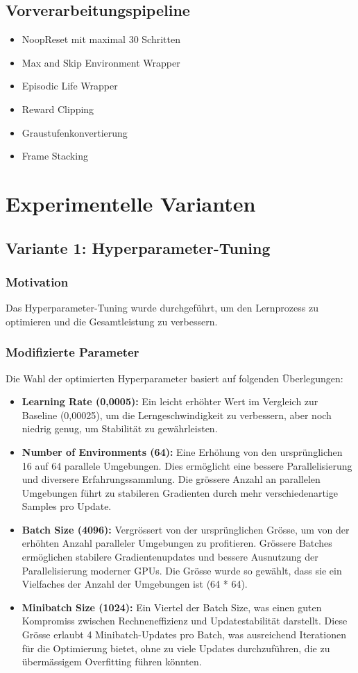\documentclass{article}
\begin{document}
\subsection{Vorverarbeitungspipeline}
\begin{itemize}
    \item NoopReset mit maximal 30 Schritten
    \item Max and Skip Environment Wrapper
    \item Episodic Life Wrapper
    \item Reward Clipping
    \item Graustufenkonvertierung
    \item Frame Stacking
\end{itemize}

\section{Experimentelle Varianten}

\subsection{Variante 1: Hyperparameter-Tuning}
\subsubsection{Motivation}
Das Hyperparameter-Tuning wurde durchgeführt, um den Lernprozess zu optimieren und die Gesamtleistung zu verbessern.

\subsubsection{Modifizierte Parameter}
Die Wahl der optimierten Hyperparameter basiert auf folgenden Überlegungen:
\begin{itemize}
\item \textbf{Learning Rate (0,0005):} Ein leicht erhöhter Wert im Vergleich zur Baseline (0,00025), um die Lerngeschwindigkeit zu verbessern, aber noch niedrig genug, um Stabilität zu gewährleisten.
\item \textbf{Number of Environments (64):} Eine Erhöhung von den ursprünglichen 16 auf 64 parallele Umgebungen. Dies ermöglicht eine bessere Parallelisierung und diversere Erfahrungssammlung. Die grössere Anzahl an parallelen Umgebungen führt zu stabileren Gradienten durch mehr verschiedenartige Samples pro Update.
\item \textbf{Batch Size (4096):} Vergrössert von der ursprünglichen Grösse, um von der erhöhten Anzahl paralleler Umgebungen zu profitieren. Grössere Batches ermöglichen stabilere Gradientenupdates und bessere Ausnutzung der Parallelisierung moderner GPUs. Die Grösse wurde so gewählt, dass sie ein Vielfaches der Anzahl der Umgebungen ist (64 * 64).
\item \textbf{Minibatch Size (1024):} Ein Viertel der Batch Size, was einen guten Kompromiss zwischen Rechneneffizienz und Updatestabilität darstellt. Diese Grösse erlaubt 4 Minibatch-Updates pro Batch, was ausreichend Iterationen für die Optimierung bietet, ohne zu viele Updates durchzuführen, die zu übermässigem Overfitting führen könnten.
\end{itemize}
\end{document}
